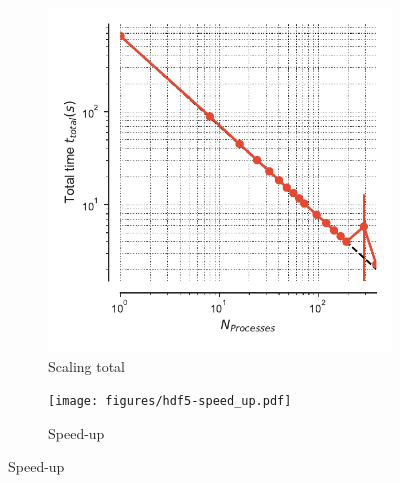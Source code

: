 \begin{figure}[!htb]
  \centering
  \begin{subfigure}{.49\textwidth}
    \includegraphics[width=\linewidth]{figures/hdf5-t_total.pdf}
    \caption{Scaling total}
    \label{fig:MPIscaling-hdf5}
  \end{subfigure}
  \hfill
  \begin{subfigure}{.49\textwidth}
    \texttt{[image: figures/hdf5-speed\_up.pdf]}
    \caption{Speed-up}
    \label{fig:MPIspeedup-hdf5}
  \end{subfigure}
  \bigskip


\end{figure}
